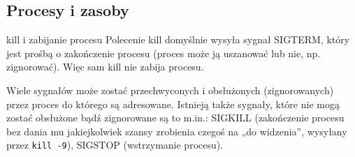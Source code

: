\subsection{Procesy i zasoby}

\begin{ProTip}[breakable]{kill i zabijanie procesu}
Polecenie kill domyślnie wysyła sygnał SIGTERM, który jest prośbą o zakończenie procesu (proces może ją uszanować lub nie, np. zignorować). Więc sam kill nie zabija procesu.

Wiele sygnałów może zostać przechwyconych i obsłużonych (zignorowanych) przez proces do którego są adresowane. Istnieją także sygnały, które nie mogą zostać obsłużone bądź zignorowane są to m.in.:
	SIGKILL (zakończenie procesu bez dania mu jakiejkolwiek szansy zrobienia czegoś na „do widzenia”, wysyłany przez \Verb#kill -9#),
	SIGSTOP (wstrzymanie procesu).
\end{ProTip}

